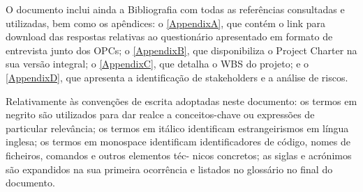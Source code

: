 O documento inclui ainda a Bibliografia com todas as referências consultadas e utilizadas, bem como os apêndices: o \autoref{AppendixA}, que contém o link para download das respostas relativas ao questionário apresentado em formato de entrevista junto dos \glspl{OPC}; o \autoref{AppendixB}, que disponibiliza o Project Charter na sua versão integral; o \autoref{AppendixC}, que detalha o \gls{WBS} do projeto; e o \autoref{AppendixD}, que apresenta a identificação de stakeholders e a análise de riscos.




Relativamente às convenções de escrita adoptadas neste documento: os termos em negrito
são utilizados para dar realce a conceitos-chave ou expressões de particular relevância; os
termos em itálico identiﬁcam estrangeirismos em língua inglesa; os termos em monospace
identiﬁcam identiﬁcadores de código, nomes de ﬁcheiros, comandos e outros elementos téc-
nicos concretos; as siglas e acrónimos são expandidos na sua primeira ocorrência e listados
no glossário no ﬁnal do documento.
